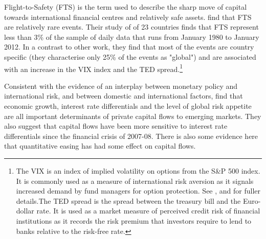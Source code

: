 \documentclass[12pt, a4paper, oneside]{article} %
\begin{document}
Flight-to-Safety (FTS) is the term used to describe the sharp move of capital towards international financial centres and relatively safe assets.\citet{FTS} find that FTS are relatively rare events. Their study of of 23 countries finds that FTS represent less than 3\% of the sample of daily data that runs from January 1980 to January 2012.  In a contrast to other work, they find that most of the events are country specific (they characterise only 25\% of the events as "global") and are associated with an increase in the VIX index and the TED spread.\footnote{The VIX is an index of implied volatility on options from the S\&P 500 index.  It is commonly used as a measure of international risk aversion as it signals increased demand by fund managers for option protection.  See \citet{VIX}, \citet{GoldmanVol} and \citet{Diamond} for fuller details.The TED spread is the spread between the treasury bill and the Euro-dollar rate.  It is used as a market measure of perceived credit risk of financial institutions as it records the risk premium that investors require to lend to banks relative to the risk-free rate.}   %


Consistent with the evidence of an interplay between monetary policy and international risk, and between domestic and international factors, \citet{Ahmed2014} find that economic growth, interest rate differentials and the level of global risk appetite are all important determinants of private capital flows to emerging markets.  They also suggest that capital flows have been more sensitive to interest rate differentials since the financial crisis of 2007-08. There is also some evidence here that quantitative easing has had some effect on capital flows. 
\end{document}

